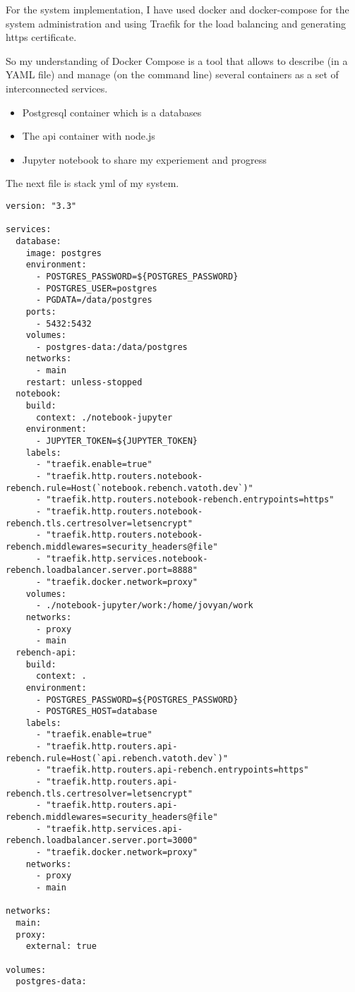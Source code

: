 
For the system implementation, I have used docker and docker-compose for the system administration and using Traefik for the load balancing and generating https certificate. 

So my understanding of  Docker Compose is a tool that allows to describe (in a YAML file) and manage (on the command line) several containers as a set of interconnected services.

\begin{itemize}

\item  Postgresql container which is a databases
\item  The api container with node.js
\item  Jupyter notebook to share my experiement and progress
\end{itemize}


\lstset{
  language=bash,
  basicstyle=\tiny
}

The next file is stack yml of my system.
\begin{lstlisting}
version: "3.3"

services:
  database:
    image: postgres
    environment:
      - POSTGRES_PASSWORD=${POSTGRES_PASSWORD}
      - POSTGRES_USER=postgres
      - PGDATA=/data/postgres
    ports:
      - 5432:5432
    volumes:
      - postgres-data:/data/postgres
    networks:
      - main
    restart: unless-stopped
  notebook:
    build:
      context: ./notebook-jupyter
    environment:
      - JUPYTER_TOKEN=${JUPYTER_TOKEN}
    labels:
      - "traefik.enable=true"
      - "traefik.http.routers.notebook-rebench.rule=Host(`notebook.rebench.vatoth.dev`)"
      - "traefik.http.routers.notebook-rebench.entrypoints=https"
      - "traefik.http.routers.notebook-rebench.tls.certresolver=letsencrypt"
      - "traefik.http.routers.notebook-rebench.middlewares=security_headers@file"
      - "traefik.http.services.notebook-rebench.loadbalancer.server.port=8888"
      - "traefik.docker.network=proxy"
    volumes:
      - ./notebook-jupyter/work:/home/jovyan/work
    networks:
      - proxy
      - main
  rebench-api:
    build:
      context: .
    environment:
      - POSTGRES_PASSWORD=${POSTGRES_PASSWORD}
      - POSTGRES_HOST=database
    labels:
      - "traefik.enable=true"
      - "traefik.http.routers.api-rebench.rule=Host(`api.rebench.vatoth.dev`)"
      - "traefik.http.routers.api-rebench.entrypoints=https"
      - "traefik.http.routers.api-rebench.tls.certresolver=letsencrypt"
      - "traefik.http.routers.api-rebench.middlewares=security_headers@file"
      - "traefik.http.services.api-rebench.loadbalancer.server.port=3000"
      - "traefik.docker.network=proxy"
    networks:
      - proxy
      - main

networks:
  main:
  proxy:
    external: true

volumes:
  postgres-data:
\end{lstlisting}
